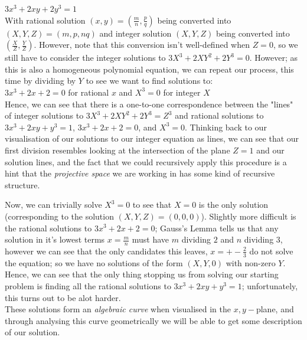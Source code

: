 \documentclass{article}
\begin{document}
 $3x^3 + 2xy + 2y^3 = 1$\\
 
With rational solution $(x, y) = (\frac{m}{n}, \frac{p}{q})$ being converted into $(X, Y, Z) = (m, p, nq)$ and integer solution $(X, Y, Z)$ being converted into $(\frac{X}{Z}, \frac{Y}{Z})$. However, note that this conversion isn't well-defined when $Z = 0$, so we still have to consider the integer solutions to $3 X^3 +  2 X Y^2 + 2 Y^3 = 0$. However; as this is also a homogeneous polynomial equation, we can repeat our process, this time by dividing by $Y$ to see we want to find solutions to: \\

$3 x^3 + 2 x + 2 = 0$ \quad for rational $x$ and $X^3 = 0$ for integer $X$\\

Hence, we can see that there is a one-to-one correspondence between the "lines" of integer solutions to $3 X^3 +  2 X Y^2 + 2 Y^3 = Z^3$ and rational solutions to  $3x^3 + 2xy + y^3 = 1$, \quad $3 x^3 + 2 x + 2 = 0$, and $X^3 = 0$. Thinking back to our visualisation of our solutions to our integer equation as lines, we can see that our first division resembles looking at the intersection of the plane $Z = 1$ and our solution lines, and the fact that we could recursively apply this procedure is a hint that the \emph{projective space} we are working in has some kind of recursive structure.

Now, we can trivially solve $X^3 = 0 $ to see that $X = 0$ is the only solution (corresponding to the solution $(X, Y, Z) = (0, 0, 0)$). Slightly more difficult is the rational solutions to $3x^3 + 2 x + 2 = 0$; Gauss's Lemma tells us that any solution in it's lowest terms $x = \frac{m}{n}$ must have $m$ dividing $2$ and $n$ dividing $3$, however we can see that the only candidates this leaves, $x = +-\frac{2}{3}$ do not solve the equation; so we have no solutions of the form $(X, Y, 0)$ with non-zero $Y$. Hence, we can see that the only thing stopping us from solving our starting problem is finding all the rational solutions to  $3x^3 + 2xy + y^3 = 1$; unfortunately, this turns out to be alot harder. \\

These solutions form an \emph{algebraic curve} when visualised in the $x,y-$plane, and through analysing this curve geometrically we will be able to get some description of our solution.\\
\end{document}

